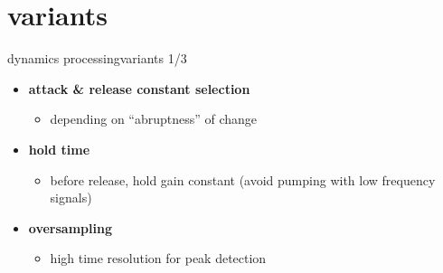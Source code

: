 \section{variants}
\begin{frame}{dynamics processing}{variants 1/3}
	\vspace{-3mm}
    \begin{itemize}
		\item	\textbf{attack \& release constant selection}
			\begin{itemize}
				\item	depending on ``abruptness'' of change
			\end{itemize}
		\pause
        \smallskip
		\item	\textbf{hold time}
			\begin{itemize}
				\item	before release, hold gain constant (avoid pumping with low frequency signals)
			\end{itemize}
		\pause
        \smallskip
		\item	\textbf{oversampling}
			\begin{itemize}
				\item	high time resolution for peak detection
			\end{itemize}
	\end{itemize}
\end{frame}

